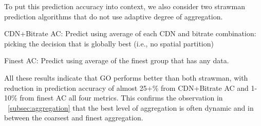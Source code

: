 To put this prediction accuracy into context, we also consider two strawman prediction algorithms that do not use adaptive degree of aggregation.
\begin{packeditemize}
	\item CDN+Bitrate AC: Predict using average of each CDN and bitrate combination: picking the decision that is globally best (i.e., no spatial partition) 
	\item Finest AC: Predict using average of the finest group that has any data.
\end{packeditemize}

All these results indicate that GO performs better than both strawman, with reduction in prediction accuracy of almost 25+\% from CDN+Bitrate AC and 1-10\% from finest AC all four metrics. This confirms the observation in \Section~\ref{subsec:aggregation} that the best level of aggregation is often dynamic and in between the coarsest and finest aggregation.

\begin{figure}[t!]
\centering
{}
\hspace{-0.6cm}
\hspace{-0.6cm}
\hspace{-0.6cm}
\label{fig:compare-to-naive}
\end{figure}

